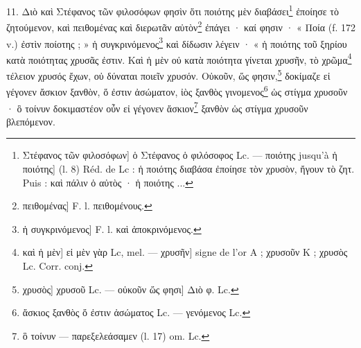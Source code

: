 \documentclass[a4paper, 11pt, oneside, polutonikogreek, french]{article}
\begin{document}
11. Διὸ καὶ Στέφανος τῶν φιλοσόφων φησὶν ὅτι ποιότης μὲν διαβάσει\footnote{Στέφανος τῶν φιλοσόφων] ὁ Στέφανος ὁ φιλόσοφος Lc. --- ποιότης jusqu'à ἡ ποιότης] (l. 8) Réd. de Lc : ἡ ποιότης διαβάσα ἐποίησε τὸν χρυσὸν, ἤγουν τὸ ζητ. Puis : καὶ πάλιν ὁ αὐτὸς · ἡ ποιότης ...} ἐποίησε τὸ ζητούμενον, καὶ πειθομένας καὶ διερωτᾶν αὐτὸν\footnote{πειθομένας] F. l. πειθομένους.} ἐπάγει · καί φησιν · « Ποία (f. 172 v.) ἐστὶν ποίοτης ; » ἡ συγκρινόμενος\footnote{ἡ συγκρινόμενος] F. l. καὶ ἀποκρινόμενος.} καὶ δίδωσιν λέγειν · « ἡ ποιότης τοῦ ξηρίου κατὰ ποιότητας χρυσᾶς ἐστιν. Καὶ ἡ μὲν οὐ κατὰ ποιότητα γίνεται χρυσῆν, τὸ χρῶμα\footnote{καὶ ἡ μὲν] εἰ μὲν γὰρ Lc, mel. --- χρυσῆν] signe de l'or A ; χρυσοῦν K ; χρυσὸς Lc. Corr. conj.} τέλειον χρυσός ἔχων, οὐ δύναται ποιεῖν χρυσόν. Οὐκοῦν, ὥς φησιν,\footnote{χρυσὸς] χρυσοῦ Lc. --- οὐκοῦν ὥς φησι] Διὸ φ. Lc.} δοκίμαζε εἰ γέγονεν ἄσκιον ξανθὸν, ὅ ἐστιν ἀσώματον, ἰὸς ξανθὸς γινομενος\footnote{ἄσκιος ξανθὸς ὅ ἐστιν ἀσώματος Lc. --- γενόμενος Lc.} ὡς στίγμα χρυσοῦν · ὃ τοίνυν δοκιμαστέον οὖν εἰ γέγονεν ἄσκιον\footnote{ὃ τοίνυν --- παρεξελεάσαμεν (l. 17) om. Lc.} ξανθὸν ὡς στίγμα χρυσοῦν βλεπόμενον.
\end{document}
